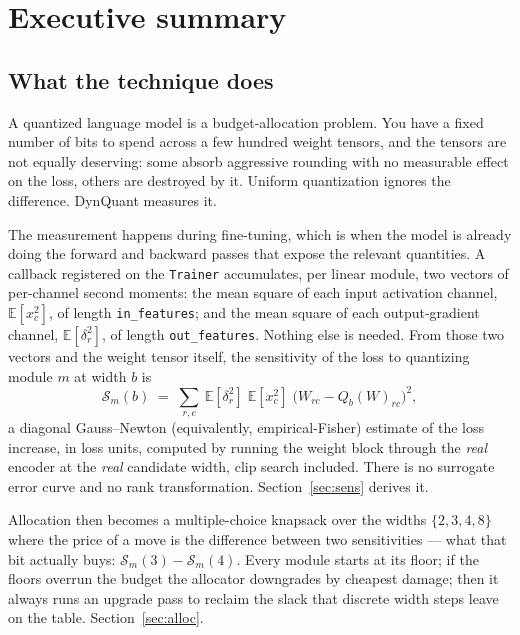 \documentclass[11pt]{article}
\newcommand{\code}[1]{\texttt{#1}}
\begin{document}
\tableofcontents
\newpage

\section{Executive summary}

\subsection{What the technique does}

A quantized language model is a budget-allocation problem. You have a fixed number of bits to
spend across a few hundred weight tensors, and the tensors are not equally deserving: some
absorb aggressive rounding with no measurable effect on the loss, others are destroyed by it.
Uniform quantization ignores the difference. DynQuant measures it.

The measurement happens during fine-tuning, which is when the model is already doing the forward
and backward passes that expose the relevant quantities. A callback registered on the
\code{Trainer} accumulates, per linear module, two vectors of per-channel second moments: the
mean square of each input activation channel, $\mathbb{E}[x_c^2]$, of length \code{in\_features};
and the mean square of each output-gradient channel, $\mathbb{E}[\delta_r^2]$, of length
\code{out\_features}. Nothing else is needed. From those two vectors and the weight tensor
itself, the sensitivity of the loss to quantizing module $m$ at width $b$ is
\begin{equation}
\mathcal{S}_m(b) \;=\; \sum_{r,c}\ \mathbb{E}[\delta_r^2]\;\mathbb{E}[x_c^2]\;
\bigl(W_{rc} - Q_b(W)_{rc}\bigr)^2 ,
\label{eq:sens}
\end{equation}
a diagonal Gauss--Newton (equivalently, empirical-Fisher) estimate of the loss increase, in loss
units, computed by running the weight block through the \emph{real} encoder at the \emph{real}
candidate width, clip search included. There is no surrogate error curve and no rank
transformation. Section~\ref{sec:sens} derives it.

Allocation then becomes a multiple-choice knapsack over the widths $\{2,3,4,8\}$ where the price
of a move is the difference between two sensitivities --- what that bit actually buys:
$\mathcal{S}_m(3) - \mathcal{S}_m(4)$. Every module starts at its floor; if the floors overrun
the budget the allocator downgrades by cheapest damage; then it always runs an upgrade pass to
reclaim the slack that discrete width steps leave on the table. Section~\ref{sec:alloc}.
\end{document}
